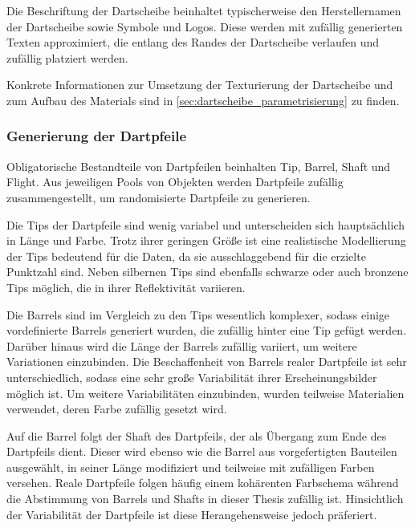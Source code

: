 Die Beschriftung der Dartscheibe beinhaltet typischerweise den Herstellernamen der Dartscheibe sowie Symbole und Logos. Diese werden mit zufällig generierten Texten approximiert, die entlang des Randes der Dartscheibe verlaufen und zufällig platziert werden.

Konkrete Informationen zur Umsetzung der Texturierung der Dartscheibe und zum Aufbau des Materials sind in \autoref{sec:dartscheibe_parametrisierung} zu finden.

\subsubsection{Generierung der Dartpfeile}

Obligatorische Bestandteile von Dartpfeilen beinhalten Tip, Barrel, Shaft und Flight. Aus jeweiligen Pools von Objekten werden Dartpfeile zufällig zusammengestellt, um randomisierte Dartpfeile zu generieren.

Die Tips der Dartpfeile sind wenig variabel und unterscheiden sich hauptsächlich in Länge und Farbe. Trotz ihrer geringen Größe ist eine realistische Modellierung der Tips bedeutend für die Daten, da sie ausschlaggebend für die erzielte Punktzahl sind. Neben silbernen Tips sind ebenfalls schwarze oder auch bronzene Tips möglich, die in ihrer Reflektivität variieren.

Die Barrels sind im Vergleich zu den Tips wesentlich komplexer, sodass einige vordefinierte Barrels generiert wurden, die zufällig hinter eine Tip gefügt werden. Darüber hinaus wird die Länge der Barrels zufällig variiert, um weitere Variationen einzubinden. Die Beschaffenheit von Barrels realer Dartpfeile ist sehr unterschiedlich, sodass eine sehr große Variabilität ihrer Erscheinungsbilder möglich ist. Um weitere Variabilitäten einzubinden, wurden teilweise Materialien verwendet, deren Farbe zufällig gesetzt wird.

Auf die Barrel folgt der Shaft des Dartpfeils, der als Übergang zum Ende des Dartpfeils dient. Dieser wird ebenso wie die Barrel aus vorgefertigten Bauteilen ausgewählt, in seiner Länge modifiziert und teilweise mit zufälligen Farben versehen. Reale Dartpfeile folgen häufig einem kohärenten Farbschema während die Abstimmung von Barrels und Shafts in dieser Thesis zufällig ist. Hinsichtlich der Variabilität der Dartpfeile ist diese Herangehensweise jedoch präferiert.

